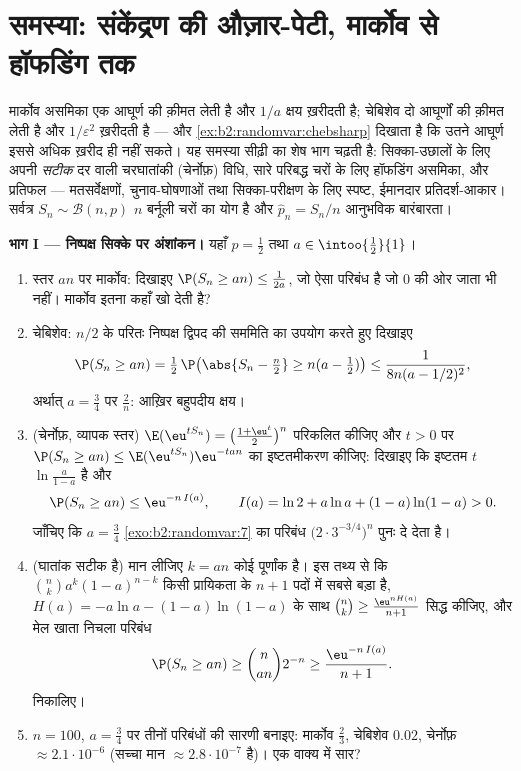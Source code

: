 \section{समस्या: संकेंद्रण की औज़ार-पेटी, मार्कोव से हॉफडिंग तक}

\begin{problem}
\label{pb:b2:randomvar:1}
मार्कोव असमिका एक आघूर्ण की क़ीमत लेती है और $1/a$ क्षय ख़रीदती है;
चेबिशेव दो आघूर्णों की क़ीमत लेती है और $1/\varepsilon^2$ ख़रीदती है --- और \cref{ex:b2:randomvar:chebsharp}
दिखाता है कि उतने आघूर्ण इससे अधिक ख़रीद ही नहीं सकते। यह समस्या
सीढ़ी का शेष भाग चढ़ती है: सिक्का-उछालों के लिए अपनी \emph{सटीक}
दर वाली चरघातांकी (चेर्नोफ़) विधि, सारे परिबद्ध चरों के लिए
हॉफडिंग असमिका, और प्रतिफल --- मतसर्वेक्षणों, चुनाव-घोषणाओं तथा
सिक्का-परीक्षण के लिए स्पष्ट, ईमानदार प्रतिदर्श-आकार।
 सर्वत्र $S_n \sim
\mathcal B(n, p)$ $n$  बर्नूली
चरों का योग है और $\widehat p_n = S_n/n$ आनुभविक बारंबारता।

\medskip
\noindent\textbf{भाग I --- निष्पक्ष सिक्के पर अंशांकन।}
यहाँ $p = \frac12$ तथा $a \in \intoo{\frac12}{1}$।
\begin{enumerate}
  \item स्तर $an$ पर मार्कोव: दिखाइए $\P(S_n \geq an) \leq
        \frac1{2a}$, जो ऐसा परिबंध है जो $0$
        की ओर जाता भी नहीं। मार्कोव इतना कहाँ खो देती है?
  \item चेबिशेव: $n/2$ के परितः निष्पक्ष द्विपद की सममिति का
        उपयोग करते हुए दिखाइए
        \[
        \P(S_n \geq an) = \tfrac12\,
        \P\bigl(\abs{S_n - \tfrac n2} \geq n(a -
        \tfrac12)\bigr)
        \leq \frac{1}{8n(a - 1/2)^2},
        \]
        अर्थात् $a = \frac34$ पर $\frac2n$: आख़िर बहुपदीय क्षय।
  \item (चेर्नोफ़, व्यापक स्तर) $\E(\eu^{tS_n}) = \bigl(\frac{1 + \eu^t}2\bigr)^n$ परिकलित कीजिए और $t > 0$ पर $\P(S_n \geq an) \leq
        \E(\eu^{tS_n})\eu^{-tan}$
        का इष्टतमीकरण कीजिए: दिखाइए कि इष्टतम $t$ $\ln\frac{a}{1-a}$ है और
        \[
        \P(S_n \geq an) \leq \eu^{-n\,I(a)},
        \qquad
        I(a) = \ln 2 + a\ln a + (1-a)\ln(1-a) > 0 .
        \]
        जाँचिए कि $a = \frac34$ \cref{exo:b2:randomvar:7} का परिबंध $\bigl(2\cdot3^{-3/4}\bigr)^n$ पुनः दे देता है।
  \item (घातांक सटीक है) मान लीजिए $k = an$ कोई पूर्णांक है। इस
        तथ्य से कि $\binom nk a^k(1-a)^{n-k}$ किसी प्रायिकता  के $n + 1$ पदों में
        सबसे बड़ा है, $H(a) = -a\ln a -
        (1-a)\ln(1-a)$ के साथ $\binom nk \geq
        \frac{\eu^{nH(a)}}{n+1}$ सिद्ध कीजिए, और मेल
        खाता निचला परिबंध
        \[
        \P(S_n \geq an) \geq \binom{n}{an}2^{-n}
        \geq \frac{\eu^{-n\,I(a)}}{n + 1} .
        \]
        निकालिए।
  \item $n = 100$, $a =
        \frac34$ पर तीनों परिबंधों की सारणी बनाइए: मार्कोव
        $\frac23$, चेबिशेव $0.02$, चेर्नोफ़ $\approx 2.1\cdot10^{-6}$ (सच्चा मान $\approx 2.8\cdot10^{-7}$
        है)। एक वाक्य में सार?
\end{enumerate}


\end{problem}
